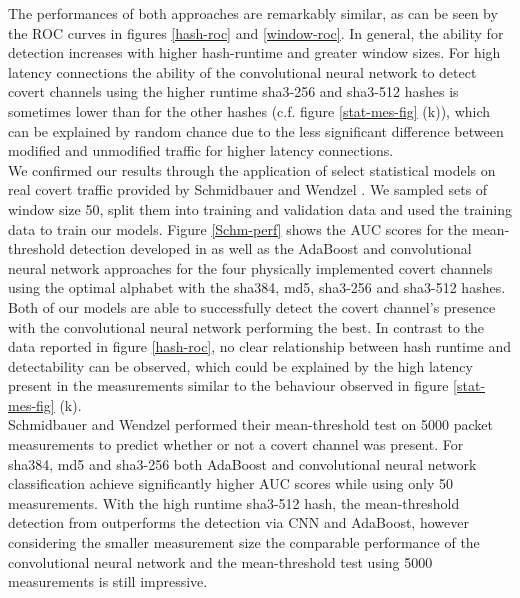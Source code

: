 \documentclass[12pt,a4paper,automark, toc=bib]{scrreprt}
\theoremstyle{definition}
\begin{document}
			The performances of both approaches are remarkably similar, as can be seen by the ROC curves in figures \ref{hash-roc} and \ref{window-roc}. In general, the ability for detection increases with higher hash-runtime and greater window sizes. For high latency connections the ability of the convolutional neural network to detect covert channels using the higher runtime sha3-256 and sha3-512 hashes is sometimes lower than for the other hashes (c.f. figure \ref{stat-mes-fig} (k)), which can be explained by random chance due to the less significant difference between modified and unmodified traffic for higher latency connections. \\
			We confirmed our results through the application of select statistical models on real covert traffic provided by Schmidbauer and Wendzel  \cite{Schmidbauer}. We sampled sets of window size 50, split them into training and validation data and used the training data to train our models. Figure \ref{Schm-perf} shows the AUC scores for the mean-threshold detection developed in \cite{Schmidbauer} as well as the AdaBoost and convolutional neural network approaches for the four physically implemented covert channels using the optimal alphabet with the sha384, md5, sha3-256 and sha3-512 hashes. Both of our models are able to successfully detect the covert channel's presence with the convolutional neural network performing the best. In contrast to the data reported in figure \ref{hash-roc}, no clear relationship between hash runtime and detectability can be observed, which could be explained by the high latency present in the measurements similar to the behaviour observed in figure \ref{stat-mes-fig} (k).\\
			Schmidbauer and Wendzel performed their mean-threshold test on 5000 packet measurements to predict whether or not a covert channel was present. For sha384, md5 and sha3-256 both AdaBoost and convolutional neural network classification achieve significantly higher AUC scores while using only 50 measurements. With the high runtime sha3-512 hash, the mean-threshold detection from \cite{Schmidbauer} outperforms the detection via CNN and AdaBoost, however considering the smaller measurement size the comparable performance of the convolutional neural network and the mean-threshold test using 5000 measurements is still impressive.
\end{document}
